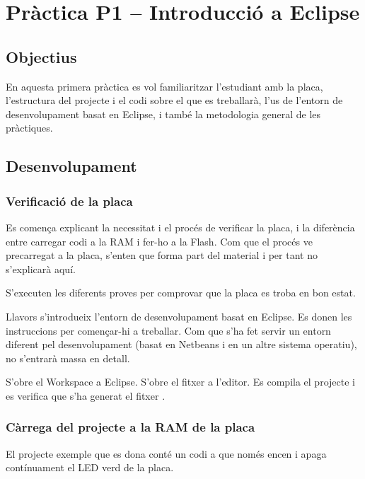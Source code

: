 \chapter{\label{ch:p1} Pràctica P1 -- Introducció a Eclipse}

\section{Objectius}

En aquesta primera pràctica es vol familiaritzar l'estudiant amb la placa,
l'estructura del projecte i el codi sobre el que es treballarà, l'us de l'entorn de
desenvolupament basat en Eclipse, i també la metodologia general de les
pràctiques.

\section{Desenvolupament}


\subsection{Verificació de la placa}

Es comença explicant la necessitat i el procés de verificar la placa,
i la diferència entre carregar codi a la RAM i fer-ho a la Flash. Com que
el procés ve precarregat a la placa, s'enten que forma part del material i
per tant no s'explicarà aquí.

S'executen les diferents proves per comprovar que la placa es troba en bon estat.

Llavors s'introdueix l'entorn de desenvolupament basat en Eclipse. Es donen
les instruccions per començar-hi a treballar. Com que s'ha fet servir un entorn
diferent pel desenvolupament (basat en Netbeans i en un altre sistema operatiu),
no s'entrarà massa en detall.

S'obre el Workspace a Eclipse. S'obre el fitxer  a l'editor.
Es compila el projecte i es verifica que s'ha generat el fitxer .


\subsection{Càrrega del projecte a la RAM de la placa}

El projecte exemple que es dona conté un codi a  que només encen
i apaga contínuament el LED verd de la placa.

